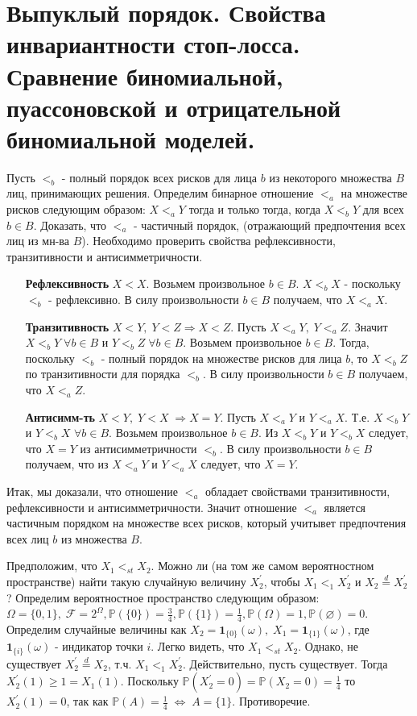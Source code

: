 \chapter{Выпуклый порядок. Свойства инвариантности стоп-лосса. Сравнение биномиальной, пуассоновской и отрицательной биномиальной моделей.}
    \problem{}
        Пусть $<_b$ - полный порядок всех рисков для лица $b$ из некоторого множества $B$ лиц, принимающих решения. Определим бинарное отношение $<_a$ на множестве рисков следующим образом: $X<_a Y$ тогда и только тогда, когда $X<_bY$ для всех $b \in B$. Доказать, что $<_a$ - частичный порядок, (отражающий предпочтения всех лиц из мн-ва $B$).
        \solution{}
            Необходимо проверить свойства рефлексивности, транзитивности и антисимметричности. 
            \begin{itemize}
                \item[\textbf{Рефлексивность}] $X<X$. Возьмем произвольное $b \in B$. $X<_b X$ - поскольку $<_b$ - рефлексивно. В силу произвольности $b \in B$ получаем, что $X<_a X$.
                \item[\textbf{Транзитивность}] $X<Y,\; Y<Z \Rightarrow X<Z$.
                Пусть $X<_aY,\; Y<_a Z$. Значит $X<_b Y \; \forall b \in B$ и $Y<_b Z \; \forall b \in B$. Возьмем произвольное $b \in B$. Тогда, поскольку $<_b$ - полный порядок на множестве рисков для лица $b$, то $X<_b Z$ по транзитивности для порядка $<_b$. В силу произвольности $b \in B$ получаем, что $X<_a Z$.
                \item[\textbf{Антисимм-ть}] $X<Y, \; Y<X \; \Rightarrow X=Y$. Пусть $X<_aY$ и $Y<_aX$. Т.е. $X<_bY$ и $Y<_bX$ $\forall b \in B$. Возьмем произвольное $b \in B$. Из $X<_b Y$ и $Y<_b X$ следует, что $X=Y$ из антисимметричности $<_b$. В силу произвольности $b \in B$ получаем, что из $X<_aY$ и $Y<_aX$ следует, что $X=Y$.
                
            \end{itemize}
            Итак, мы доказали, что отношение $<_a$ обладает свойствами транзитивности, рефлексивности и антисимметричности. Значит отношение $<_a$ является частичным порядком на множестве всех рисков, который учитывет предпочтения всех лиц $b$ из множества $B$.
    
    \problem{}
        Предположим, что $X_1 <_{st} X_2$. Можно ли (на том же самом вероятностном пространстве) найти такую случайную величину $X^\prime_2$, чтобы $X_1 <_1 X^\prime_2$ и $X_2 \stackrel{d}{=} X^\prime_2$ ?
        \solution{}
            Определим вероятностное пространство следующим образом: $\Omega=\{0,1\},\; \mathcal{F} = 2^\Omega, \mathbb P(\{0\}) = \frac34, \mathbb P(\{1\}) = \frac14, \mathbb P(\Omega) = 1, \mathbb P(\varnothing) = 0$. Определим случайные величины как $X_2 = \textbf{1}_{\{0\}}(\omega), \; X_1 = \textbf{1}_{\{1\}}(\omega)$, где $\textbf{1}_{\{i\}}(\omega)$ - индикатор точки $i$. Легко видеть, что $X_1 <_{st} X_2$. Однако, не существует $X^\prime_2 \stackrel{d}{=} X_2$, т.ч. $X_1 <_1 X^\prime_2 $. Действительно, пусть существует. Тогда $X^\prime_2(1) \geq 1 = X_1(1)$. Поскольку $\mathbb P(X^\prime_2 = 0) = \mathbb P (X_2 = 0) =\frac14$ то $X^\prime_2(1) = 0$, так как $\mathbb P(A) = \frac{1}{4} \; \Leftrightarrow \; A=\{1\} $. Противоречие.
            
